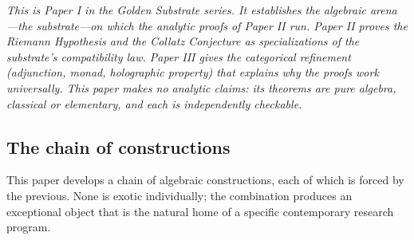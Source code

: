 \documentclass[11pt,a4paper]{article}
\theoremstyle{plain}
\theoremstyle{definition}
\theoremstyle{remark}
\numberwithin{equation}{section}
\newenvironment{sectionopener}
  {\begin{sectionopenerframe}\small\itshape\ignorespaces}
  {\end{sectionopenerframe}}
\begin{document}
\begin{sectionopener}
This is Paper I in the Golden Substrate series.  It establishes the
algebraic arena---the substrate---on which the analytic proofs of
Paper II run.  Paper II proves the Riemann Hypothesis and the
Collatz Conjecture as specializations of the substrate's
compatibility law.  Paper III gives the categorical refinement
(adjunction, monad, holographic property) that explains why the
proofs work universally.  This paper makes no analytic claims:
its theorems are pure algebra, classical or elementary, and each
is independently checkable.
\end{sectionopener}

\subsection*{The chain of constructions}

This paper develops a chain of algebraic constructions, each of
which is forced by the previous.  None is exotic individually; the
combination produces an exceptional object that is the natural home
of a specific contemporary research program.
\end{document}
